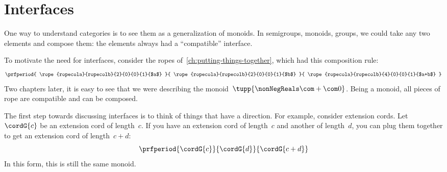 
\section{Interfaces}\label{sec:interfaces}

One way to understand categories is to see them as a generalization of monoids.
In semigroups, monoids, groups, we could take any two elements and compose them: the elements always had a ``compatible'' interface.

To motivate the need for interfaces, consider the ropes of~\cref{ch:putting-things-together}, which had this composition rule:
%
\begin{equation*}
    \prfperiod{
        \rope{ropecola}{ropecolb}{2}{0}{0}{1}{$a$}
    }{
        \rope{ropecola}{ropecolb}{2}{0}{0}{1}{$b$}
    }{
        \rope{ropecola}{ropecolb}{4}{0}{0}{1}{$a+b$}
    }
\end{equation*}
%
Two chapters later, it is easy to see that we were describing the monoid~$\tupp{\nonNegReals \com + \com 0}$.
Being a monoid, all pieces of rope are compatible and can be composed.

The first step towards discussing interfaces is to think of things that have a direction.
For example, consider extension cords.
Let~$\cordG{c}$ be an extension cord of length~$c$.
If you have an extension cord of length~$c$ and another of length~$d$, you can plug them together to get an extension cord of length~$c+d$:
%
\begin{equation}
    \label{eq:cords}
    \prfperiod{
        \cordG{c}
    }{
        \cordG{d}
    }{
        \cordG{c+d}
    }
\end{equation}
%
In this form, this is still the same monoid.

